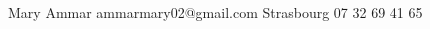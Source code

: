 \documentclass[lighthipster]{simplehipstercv}
\begin{document}
\begin{paracol}{2}
\vfill{} %

\setlength{\parindent}{0pt}
\begin{minipage}[t]{\linewidth}
    
\begin{center}\fontfamily{\sfdefault}\selectfont \color{black!70}
{\small Mary Ammar ammarmary02@gmail.com Strasbourg  07 32 69 41 65 %
}
\end{center}
\end{minipage}

\end{paracol}
\end{document}
